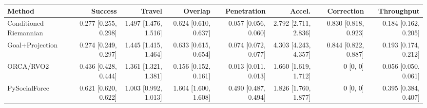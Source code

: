 \begin{tabular}{lrrrrrrr}
\toprule
Method & Success & Travel & Overlap & Penetration & Accel. & Correction & Throughput \\
\midrule
Conditioned Riemannian & 0.277 [0.255, 0.298] & 1.497 [1.476, 1.516] & 0.624 [0.610, 0.637] & 0.057 [0.056, 0.060] & 2.792 [2.711, 2.836] & 0.830 [0.818, 0.923] & 0.184 [0.162, 0.205] \\
Goal+Projection & 0.274 [0.249, 0.297] & 1.445 [1.415, 1.464] & 0.633 [0.615, 0.654] & 0.074 [0.072, 0.077] & 4.303 [4.243, 4.357] & 0.844 [0.822, 0.887] & 0.193 [0.174, 0.212] \\
ORCA/RVO2 & 0.436 [0.428, 0.444] & 1.361 [1.321, 1.381] & 0.156 [0.152, 0.161] & 0.013 [0.011, 0.013] & 1.660 [1.619, 1.712] & 0 [0, 0] & 0.056 [0.050, 0.061] \\
PySocialForce & 0.621 [0.620, 0.622] & 1.003 [0.992, 1.013] & 1.604 [1.600, 1.608] & 0.490 [0.487, 0.494] & 1.826 [1.760, 1.877] & 0 [0, 0] & 0.395 [0.384, 0.407] \\
\bottomrule
\end{tabular}
